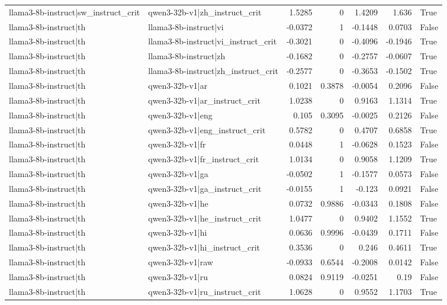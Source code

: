 \begin{table}
\begin{tabular}{l l r r r r l}
llama3-8b-instruct|sw_instruct_crit & qwen3-32b-v1|zh_instruct_crit & 1.5285 & 0 & 1.4209 & 1.636 & True \\
llama3-8b-instruct|th & llama3-8b-instruct|vi & -0.0372 & 1 & -0.1448 & 0.0703 & False \\
llama3-8b-instruct|th & llama3-8b-instruct|vi_instruct_crit & -0.3021 & 0 & -0.4096 & -0.1946 & True \\
llama3-8b-instruct|th & llama3-8b-instruct|zh & -0.1682 & 0 & -0.2757 & -0.0607 & True \\
llama3-8b-instruct|th & llama3-8b-instruct|zh_instruct_crit & -0.2577 & 0 & -0.3653 & -0.1502 & True \\
llama3-8b-instruct|th & qwen3-32b-v1|ar & 0.1021 & 0.3878 & -0.0054 & 0.2096 & False \\
llama3-8b-instruct|th & qwen3-32b-v1|ar_instruct_crit & 1.0238 & 0 & 0.9163 & 1.1314 & True \\
llama3-8b-instruct|th & qwen3-32b-v1|eng & 0.105 & 0.3095 & -0.0025 & 0.2126 & False \\
llama3-8b-instruct|th & qwen3-32b-v1|eng_instruct_crit & 0.5782 & 0 & 0.4707 & 0.6858 & True \\
llama3-8b-instruct|th & qwen3-32b-v1|fr & 0.0448 & 1 & -0.0628 & 0.1523 & False \\
llama3-8b-instruct|th & qwen3-32b-v1|fr_instruct_crit & 1.0134 & 0 & 0.9058 & 1.1209 & True \\
llama3-8b-instruct|th & qwen3-32b-v1|ga & -0.0502 & 1 & -0.1577 & 0.0573 & False \\
llama3-8b-instruct|th & qwen3-32b-v1|ga_instruct_crit & -0.0155 & 1 & -0.123 & 0.0921 & False \\
llama3-8b-instruct|th & qwen3-32b-v1|he & 0.0732 & 0.9886 & -0.0343 & 0.1808 & False \\
llama3-8b-instruct|th & qwen3-32b-v1|he_instruct_crit & 1.0477 & 0 & 0.9402 & 1.1552 & True \\
llama3-8b-instruct|th & qwen3-32b-v1|hi & 0.0636 & 0.9996 & -0.0439 & 0.1711 & False \\
llama3-8b-instruct|th & qwen3-32b-v1|hi_instruct_crit & 0.3536 & 0 & 0.246 & 0.4611 & True \\
llama3-8b-instruct|th & qwen3-32b-v1|raw & -0.0933 & 0.6544 & -0.2008 & 0.0142 & False \\
llama3-8b-instruct|th & qwen3-32b-v1|ru & 0.0824 & 0.9119 & -0.0251 & 0.19 & False \\
llama3-8b-instruct|th & qwen3-32b-v1|ru_instruct_crit & 1.0628 & 0 & 0.9552 & 1.1703 & True \\

\end{tabular}
\end{table}

